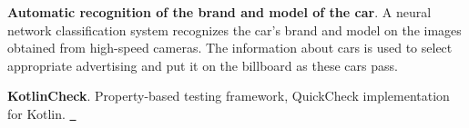 
\begin{cvparagraph}
    \begin{cvitems1}
        \item
        {\bf Automatic recognition of the brand and model of the car}.
        A neural network classification system recognizes the car's brand and model on the images obtained from high-speed cameras. The information about cars is used to select appropriate advertising and put it on the billboard as these cars pass. \href{https://www.technologyreview.com/2017/03/02/5370/moscow-billboard-targets-ads-based-on-the-car-youre-driving/}{\faLink}
        \item
        {\bf KotlinCheck}.
        Property-based testing framework, QuickCheck implementation for Kotlin. \href{https://github.com/mchernyavsky/kotlincheck}{\ \faGithub}
    \end{cvitems1}
\end{cvparagraph}
